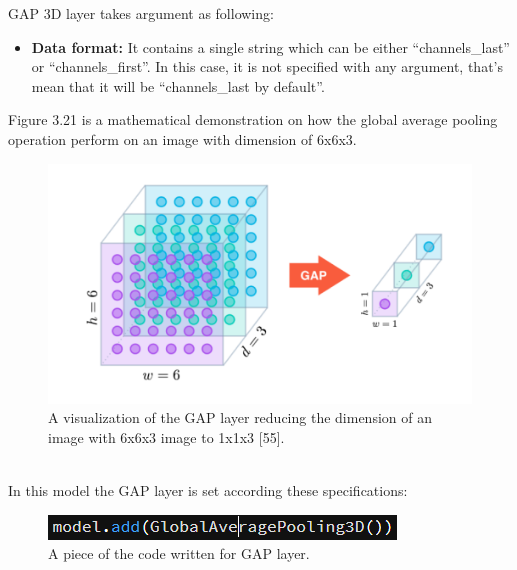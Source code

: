 \begin{itemize}
GAP 3D layer takes argument as following:\hfill \\
\noindent{}
\begin{itemize}
    \item \textbf{Data format:} It contains a single string which can be either “channels\_last” or “channels\_first”.  In this case, it is not specified with any argument, that’s mean that it will be “channels\_last by default”.\hfill \\
\end{itemize}
\newpage
Figure 3.21 is a mathematical demonstration on how the global average pooling operation perform on an image with dimension of 6x6x3.\\
 \begin{figure}[ht]
    \centering
    \includegraphics{Figures/gap1}
    \decoRule
    \caption[A visualization of the GAP layer reducing the dimension of an image with 6x6x3 image to 1x1x3 "55"]{A visualization of the GAP layer reducing the dimension of an image with 6x6x3 image to 1x1x3 [55].}
    \label{fig:la}
    \end{figure}\hfill \\
In this model the GAP layer is set according these specifications:\\
 \begin{figure}[ht]
    \centering
    \includegraphics{Figures/GAPcode}
    \decoRule
    \caption[A piece of the code written for GAP layer.]{A piece of the code written for GAP layer.}

\end{figure}
\end{itemize}
